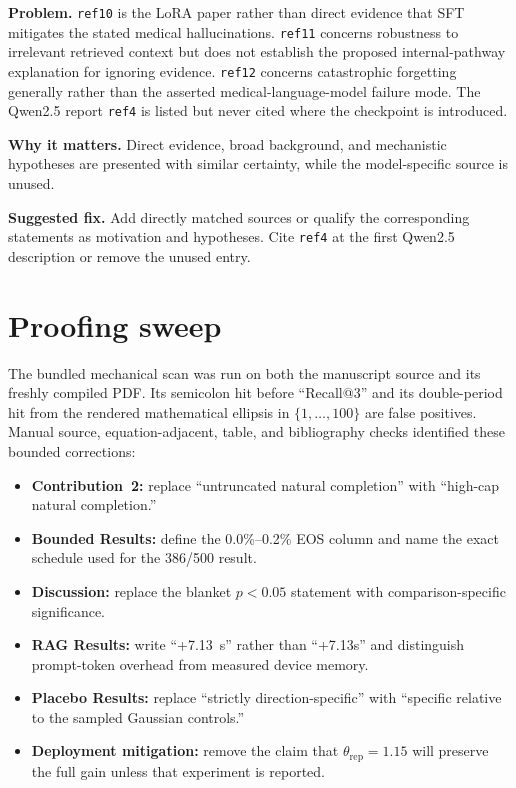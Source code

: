 \documentclass[11pt]{article}
\newcommand{\findinglabel}[1]{\textbf{#1}}
\begin{document}
\findinglabel{Problem.} \texttt{ref10} is the LoRA paper rather than direct evidence that SFT mitigates the stated medical hallucinations.  \texttt{ref11} concerns robustness to irrelevant retrieved context but does not establish the proposed internal-pathway explanation for ignoring evidence.  \texttt{ref12} concerns catastrophic forgetting generally rather than the asserted medical-language-model failure mode.  The Qwen2.5 report \texttt{ref4} is listed but never cited where the checkpoint is introduced.

\findinglabel{Why it matters.} Direct evidence, broad background, and mechanistic hypotheses are presented with similar certainty, while the model-specific source is unused.

\findinglabel{Suggested fix.} Add directly matched sources or qualify the corresponding statements as motivation and hypotheses.  Cite \texttt{ref4} at the first Qwen2.5 description or remove the unused entry.

\section*{Proofing sweep}

The bundled mechanical scan was run on both the manuscript source and its freshly compiled PDF.  Its semicolon hit before ``Recall@3'' and its double-period hit from the rendered mathematical ellipsis in $\{1,\ldots,100\}$ are false positives.  Manual source, equation-adjacent, table, and bibliography checks identified these bounded corrections:

\begin{itemize}
    \item \textbf{Contribution~2:} replace ``untruncated natural completion'' with ``high-cap natural completion.''
    \item \textbf{Bounded Results:} define the 0.0\%--0.2\% EOS column and name the exact schedule used for the 386/500 result.
    \item \textbf{Discussion:} replace the blanket $p<0.05$ statement with comparison-specific significance.
    \item \textbf{RAG Results:} write ``+7.13~s'' rather than ``+7.13s'' and distinguish prompt-token overhead from measured device memory.
    \item \textbf{Placebo Results:} replace ``strictly direction-specific'' with ``specific relative to the sampled Gaussian controls.''
    \item \textbf{Deployment mitigation:} remove the claim that $\theta_{\text{rep}}=1.15$ will preserve the full gain unless that experiment is reported.
\end{itemize}
\end{document}
